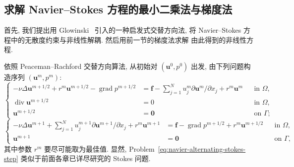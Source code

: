 \subsection{求解 Navier--Stokes 方程的最小二乘法与梯度法}
\label{subsec:navier-least-squares-gradient}

首先, 我们提出用 Glowinski~\cite{Glowinski36} 引入的一种启发式交替方向法,
将 Navier--Stokes 方程中的无散度约束与非线性解耦. 然后用前一节的梯度法求解
由此得到的非线性方程.

依照 Peaceman--Rachford 交替方向算法, 从初始对 $(\boldsymbol u^0,p^0)$ 出发,
由下列问题构造序列 $(\boldsymbol u^m,p^m)$:
\begin{equation}
\label{eq:navier-alternating-stokes-step}
\left\{
\begin{aligned}
-\nu\Delta\boldsymbol u^{m+1/2}+r^m\boldsymbol u^{m+1/2}
-\operatorname{grad}p^{m+1/2}
&=\boldsymbol f-\sum_{j=1}^N u_j^m\partial\boldsymbol u^m/\partial x_j
+r^m\boldsymbol u^m &&\text{in }\Omega,\\
\operatorname{div}\boldsymbol u^{m+1/2}&=0 &&\text{in }\Omega,\\
\boldsymbol u^{m+1/2}&=\boldsymbol0 &&\text{on }\Gamma;
\end{aligned}
\right.
\end{equation}
\begin{equation}
\label{eq:navier-alternating-nonlinear-step}
\left\{
\begin{aligned}
-\nu\Delta\boldsymbol u^{m+1}
+\sum_{j=1}^N u_j^{m+1}\partial\boldsymbol u^{m+1}/\partial x_j
+r^m\boldsymbol u^{m+1}
&=\boldsymbol f-\operatorname{grad}p^{m+1/2}
+r^m\boldsymbol u^{m+1/2} &&\text{in }\Omega,\\
\boldsymbol u^{m+1}&=\boldsymbol0 &&\text{on }\Gamma,
\end{aligned}
\right.
\end{equation}
其中参数 $r^m$ 要尽可能取为最佳值. 显然, Problem~\eqref{eq:navier-alternating-stokes-step}
类似于前面各章已详尽研究的 Stokes 问题.
